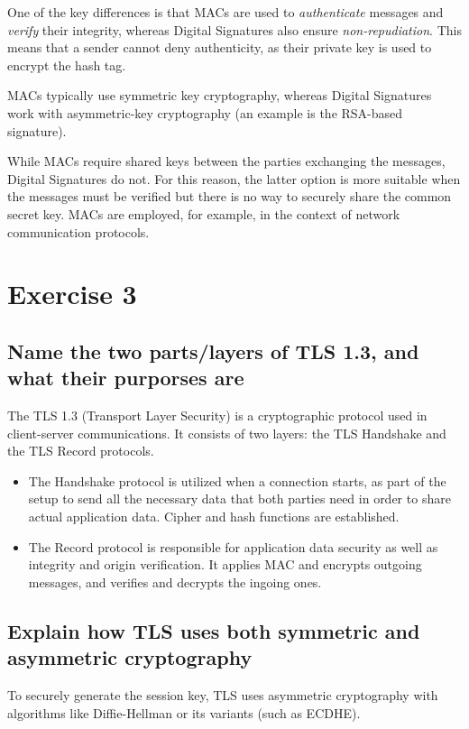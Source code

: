 \documentclass{article}
\begin{document}
One of the key differences is that MACs are used to \textit{authenticate} messages and \textit{verify} their integrity, whereas Digital Signatures also ensure \textit{non-repudiation}. This means that a sender cannot deny authenticity, as their private key is used to encrypt the hash tag.

MACs typically use symmetric key cryptography, whereas Digital Signatures work with asymmetric-key cryptography (an example is the RSA-based signature). 

While MACs require shared keys between the parties exchanging the messages, Digital Signatures do not. For this reason, the latter option is more suitable when the messages must be verified but there is no way to securely share the common secret key.
MACs are employed, for example, in the context of network communication protocols.

\section{Exercise 3}
\subsection{Name the two parts/layers of TLS 1.3, and what their purporses are}
The TLS 1.3 (Transport Layer Security) is a cryptographic protocol used in client-server communications.
It consists of two layers: the TLS Handshake and the TLS Record protocols.
\begin{itemize}
    \item The Handshake protocol is utilized when a connection starts, as part of the setup to send all the necessary data that both parties need in order to share actual application data. Cipher and hash functions are established.
    \item The Record protocol is responsible for  application data security as well as integrity and origin verification. It applies MAC and encrypts outgoing messages, and verifies and decrypts the ingoing ones.
\end{itemize}

\subsection{Explain how TLS uses both symmetric and asymmetric cryptography}
To securely generate the session key, TLS uses asymmetric cryptography with algorithms like Diffie-Hellman or its variants (such as ECDHE).
\end{document}
